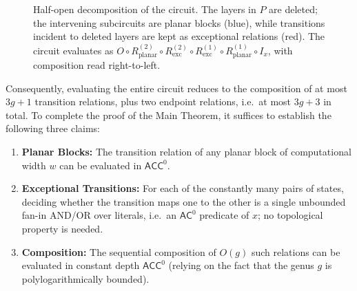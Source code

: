 \documentclass[11pt]{article}
\theoremstyle{definition}
\theoremstyle{remark}
\newcommand{\ACC}{\mathsf{ACC}^0}
\newcommand{\AC}{\mathsf{AC}^0}
\newcommand{\comp}{\circ}
\begin{document}
\begin{figure}[t]
\caption{Half-open decomposition of the circuit. The layers in $P$ are deleted; the intervening subcircuits are planar blocks (blue), while transitions incident to deleted layers are kept as exceptional relations (red). The circuit evaluates as $O \comp R_{\text{planar}}^{(2)} \comp R_{\text{exc}}^{(2)} \comp R_{\text{exc}}^{(1)} \comp R_{\text{planar}}^{(1)} \comp I_x$, with composition read right-to-left.}
\label{fig:planarizer_decomp}
\end{figure}

Consequently, evaluating the entire circuit reduces to the composition of at most $3g+1$ transition relations, plus two endpoint relations, i.e.\ at most $3g+3$ in total. To complete the proof of the Main Theorem, it suffices to establish the following three claims:
\begin{enumerate}
    \item \textbf{Planar Blocks:} The transition relation of any planar block of computational width $w$ can be evaluated in $\ACC$.
    \item \textbf{Exceptional Transitions:} For each of the constantly many pairs of states, deciding whether the transition maps one to the other is a single unbounded fan-in $\mathrm{AND}$/$\mathrm{OR}$ over literals, i.e.\ an $\AC$ predicate of $x$; no topological property is needed.
    \item \textbf{Composition:} The sequential composition of $O(g)$ such relations can be evaluated in constant depth $\ACC$ (relying on the fact that the genus $g$ is polylogarithmically bounded).
\end{enumerate}
\end{document}
